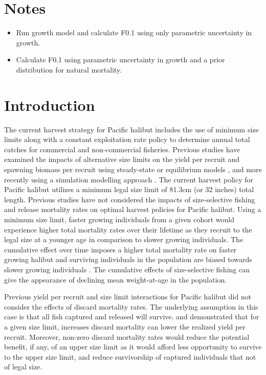 \section{Notes} %
\label{sec:notes}

\begin{itemize}
	\item Run growth model and calculate F0.1  using only parametric uncertainty in growth.
	\item Calculate F0.1 using parametric uncertainty in growth and a prior distribution for natural mortality.
\end{itemize}



\section*{Introduction} %
\label{sec:introduction}

The current harvest strategy for Pacific halibut includes the use of minimum size limits along with a constant exploitation rate policy to determine annual total catches for commercial and non-commercial fisheries.  Previous studies have examined the impacts of alternative size limits on the yield per recruit and spawning biomass per recruit using steady-state or equilibrium models \citep{clark1995re}, and more recently using a simulation modelling approach \citep{clark2006assessment}.  The current harvest policy for Pacific halibut utilizes a minimum legal size limit of 81.3cm (or 32 inches) total length.  Previous studies have not considered the impacts of size-selective fishing and release mortality rates on optimal harvest policies for Pacific halibut.  Using a minimum size limit, faster growing individuals from a given cohort would experience higher total mortality rates over their lifetime as they recruit to the legal size at a younger age in comparison to slower growing individuals. The cumulative effect over time imposes a higher total mortality rate on faster growing halibut and surviving individuals in the population are biased towards slower growing individuals \citep{Taylor2005}. The cumulative effects of size-selective fishing can give the appearance of declining mean weight-at-age in the population.

Previous yield per recruit and size limit interactions for Pacific halibut did not consider the effects of discard mortality rates. The underlying assumption in this case is that all fish captured and released will survive. \cite{coggins2007ecm} and \cite{pineiii2008car} demonstrated that for a given size limit, increases discard mortality can lower the realized yield per recruit. Moreover, non-zero discard mortality rates would reduce the potential benefit, if any, of an upper size limit as it would afford less opportunity to survive to the upper size limit, and reduce survivorship of captured individuals that not of legal size.

